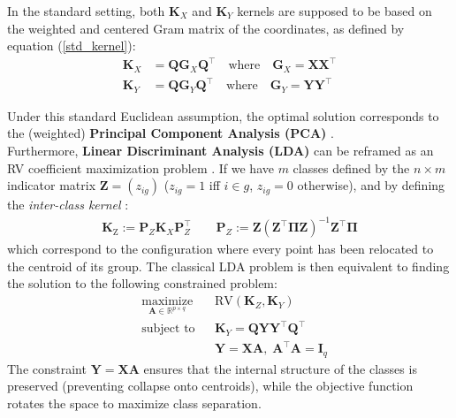 \documentclass[11pt]{article}
\begin{document}
	In the standard setting, both $\mathbf{K}_X$ and $\mathbf{K}_Y$ kernels are supposed to be based on the weighted and centered Gram matrix of the coordinates, as defined by equation (\ref{std_kernel}): 
	\begin{align}
		\mathbf{K}_X &= \mathbf{Q} \mathbf{G}_X \mathbf{Q}^\top \quad \text{where} \quad \mathbf{G}_X = \mathbf{X}\mathbf{X}^\top \\
		\mathbf{K}_Y &= \mathbf{Q} \mathbf{G}_Y \mathbf{Q}^\top \quad \text{where} \quad \mathbf{G}_Y = \mathbf{Y}\mathbf{Y}^\top
	\end{align}
	
	Under this standard Euclidean assumption, the optimal solution corresponds to the (weighted) \textbf{Principal Component Analysis (PCA)} \citep{robert_unifying_1976}. \\
	
	Furthermore, \textbf{Linear Discriminant Analysis (LDA)} can be reframed as an RV coefficient maximization problem \citep{robert_unifying_1976}. If we have $m$ classes defined by the $n \times m$ indicator matrix $\mathbf{Z} = (z_{ig})$ ($z_{ig} = 1$ iff $i \in g$, $z_{ig} = 0$ otherwise), and by defining the \emph{inter-class kernel} :
	\begin{gather}
		\mathbf{K}_\text{Z} := \mathbf{P}_Z \mathbf{K}_X \mathbf{P}^\top_Z \qquad
		\mathbf{P}_Z := \mathbf{Z}(\mathbf{Z}^\top \bm{\Pi} \mathbf{Z})^{-1} \mathbf{Z}^\top \bm{\Pi}
	\end{gather}
	which correspond to the configuration where every point has been relocated to the centroid of its group. The classical LDA problem is then equivalent to finding the solution to the following constrained problem:
	\begin{equation}
		\begin{aligned}
			& \underset{\mathbf{A} \in \mathbb{R}^{p \times q}}{\text{maximize}}
			& & \text{RV}(\mathbf{K}_{Z}, \mathbf{K}_Y) \\
			& \text{subject to} & & \mathbf{K}_Y = \mathbf{Q} \mathbf{Y}\mathbf{Y}^\top \mathbf{Q}^\top \\
			& & & \mathbf{Y} = \mathbf{X} \mathbf{A}, \; \mathbf{A}^\top \mathbf{A} = \mathbf{I}_q
		\end{aligned}
	\end{equation}
	The constraint $\mathbf{Y} = \mathbf{X}\mathbf{A}$ ensures that the internal structure of the classes is preserved (preventing collapse onto centroids), while the objective function rotates the space to maximize class separation. \\
	
\end{document}
